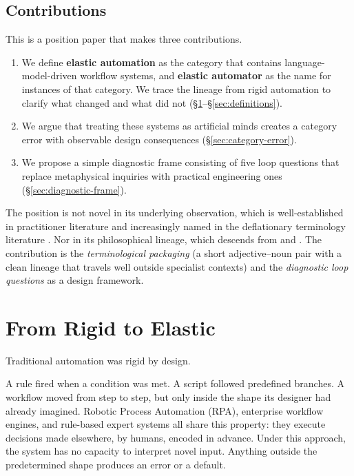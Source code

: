 \documentclass[11pt,a4paper]{article}
\begin{document}
\subsection{Contributions}

This is a position paper that makes three contributions.

\begin{enumerate}
  \item We define \textbf{elastic automation} as the category that contains language-model-driven workflow systems, and \textbf{elastic automator} as the name for instances of that category. We trace the lineage from rigid automation to clarify what changed and what did not (\S\ref{sec:rigid-to-elastic}--\S\ref{sec:definitions}).
  \item We argue that treating these systems as artificial minds creates a category error with observable design consequences (\S\ref{sec:category-error}).
  \item We propose a simple diagnostic frame consisting of five loop questions that replace metaphysical inquiries with practical engineering ones (\S\ref{sec:diagnostic-frame}).
\end{enumerate}

The position is not novel in its underlying observation, which is well-established in practitioner literature \citep{anthropic2024agents,zaharia2024compound,ibm2026agentic} and increasingly named in the deflationary terminology literature \citep{shanahan2024talking,benderhanna2025aicon}. Nor in its philosophical lineage, which descends from \citet{searle1980minds} and \citet{dreyfus1972computers}. The contribution is the \textit{terminological packaging} (a short adjective--noun pair with a clean lineage that travels well outside specialist contexts) and the \textit{diagnostic loop questions} as a design framework.

\section{From Rigid to Elastic}\label{sec:rigid-to-elastic}

Traditional automation was rigid by design.

A rule fired when a condition was met. A script followed predefined branches. A workflow moved from step to step, but only inside the shape its designer had already imagined. Robotic Process Automation (RPA), enterprise workflow engines, and rule-based expert systems all share this property: they execute decisions made elsewhere, by humans, encoded in advance. Under this approach, the system has no capacity to interpret novel input. Anything outside the predetermined shape produces an error or a default.
\end{document}
